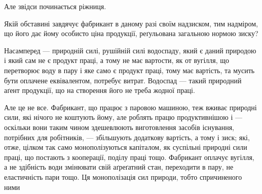 Але звідси починається ріжниця.

Якій обставині завдячує фабрикант в даному разі своїм надзиском, тим надміром,
що його дає йому особисто ціна продукції, реґульована загальною нормою зиску?

Насамперед — природній силі, рушійній силі водоспаду, який є даний природою
і який сам не є продукт праці, а тому не має вартости, як от вугілля,
що перетворює воду в пару і яке само є продукт праці, тому має вартість,
та мусить бути оплачене еквівалентом, потребує витрат. Водоспад — такий природний
аґент продукції, що на створення його не треба жодної праці.

Але це не все. Фабрикант, що працює з паровою машиною, теж вживає
природні сили, які нічого не коштують йому, але роблять працю продуктивнішою
і — оскільки вони таким чином здешевлюють виготовлення засобів існування,
потрібних для робітників, — збільшують додаткову вартість, а тому і зиск; які,
отже, цілком так само монополізуються капіталом, як суспільні природні сили
праці, що постають з кооперації, поділу праці тощо. Фабрикант оплачує вугілля,
а не здібність води змінювати свій аґреґатний стан, переходити в пару, не
еластичність пари тощо. Ця монополізація сил природи, тобто спричиненого ними
\parbreak{}  %
